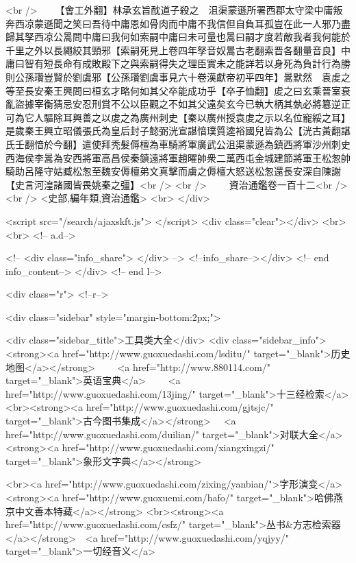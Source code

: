 <br />
　　【會工外翻】林承玄旨酖道子殺之　沮渠蒙遜所署西郡太守梁中庸叛奔西凉蒙遜聞之笑曰吾待中庸恩如骨肉而中庸不我信但自負耳孤豈在此一人邪乃盡歸其孥西凉公暠問中庸曰我何如索嗣中庸曰未可量也暠曰嗣才度若敵我者我何能於千里之外以長繩絞其頸邪【索嗣死見上卷四年孥音奴暠古老翻索晋各翻量音良】中庸曰智有短長命有成敗殿下之與索嗣得失之理臣實未之能詳若以身死為負計行為勝則公孫瓚豈賢於劉虞邪【公孫瓚劉虞事見六十卷漢獻帝初平四年】暠默然　袁䖍之等至長安秦王興問曰桓玄才略何如其父卒能成功乎【卒子恤翻】䖍之曰玄乘晉室衰亂盜據宰衡猜忌安忍刑賞不公以臣觀之不如其父遠矣玄今已執大柄其埶必將簒逆正可為它人驅除耳興善之以䖍之為廣州刺史【秦以廣州授袁䖍之示以名位寵綏之耳】　是歲秦王興立昭儀張氏為皇后封子懿弼洸宣諶愔璞質逵裕國兒皆為公【洸古黃翻諶氏壬翻愔於今翻】遣使拜秃髮傉檀為車騎將軍廣武公沮渠蒙遜為鎮西將軍沙州刺史西海侯李暠為安西將軍高昌侯秦鎮遠將軍趙曜帥衆二萬西屯金城建節將軍王松怱帥騎助呂隆守姑臧松怱至魏安傉檀弟文真擊而虜之傉檀大怒送松怱還長安深自陳謝【史言河湟諸國皆畏姚秦之彊】<br />
<br />
　　資治通鑑卷一百十二<br />
<br />
<史部,編年類,資治通鑑>  <br>
   </div> 

<script src="/search/ajaxskft.js"> </script>
 <div class="clear"></div>
<br>
<br>
 <!-- a.d-->

 <!--
<div class="info_share">
</div> 
-->
 <!--info_share--></div>   <!-- end info_content-->
  </div> <!-- end l-->

<div class="r">   <!--r-->



<div class="sidebar"  style="margin-bottom:2px;">

 
<div class="sidebar_title">工具类大全</div>
<div class="sidebar_info">
<strong><a href="http://www.guoxuedashi.com/lsditu/" target="_blank">历史地图</a></strong>　　
<a href="http://www.880114.com/" target="_blank">英语宝典</a>　　
<a href="http://www.guoxuedashi.com/13jing/" target="_blank">十三经检索</a>　
<br><strong><a href="http://www.guoxuedashi.com/gjtsjc/" target="_blank">古今图书集成</a></strong>　
<a href="http://www.guoxuedashi.com/duilian/" target="_blank">对联大全</a>　<strong><a href="http://www.guoxuedashi.com/xiangxingzi/" target="_blank">象形文字典</a></strong>　

<br><a href="http://www.guoxuedashi.com/zixing/yanbian/">字形演变</a>　　<strong><a href="http://www.guoxuemi.com/hafo/" target="_blank">哈佛燕京中文善本特藏</a></strong>
<br><strong><a href="http://www.guoxuedashi.com/csfz/" target="_blank">丛书&方志检索器</a></strong>　<a href="http://www.guoxuedashi.com/yqjyy/" target="_blank">一切经音义</a>　　

